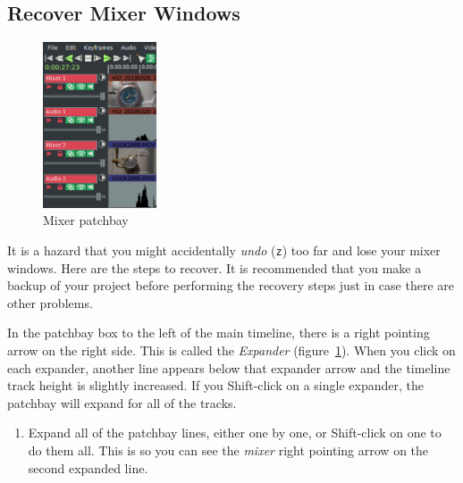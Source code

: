 \subsection{Recover Mixer Windows}%
\label{sub:recover_mixer_windows}

\begin{figure} 
    \vspace{-1ex}
    \centering
    \includegraphics[width=0.3\textwidth]{images/mixer-patchbay01.png}
    \caption{Mixer  patchbay}
    \label{fig:mixer-patchbay01}
\end{figure} 

It is a hazard that you might accidentally \textit{undo} (\texttt{z}) too far and lose your mixer windows.  Here are the steps to recover.  It is recommended that you make a backup of your project before performing the recovery steps just in case there are other problems.

In the patchbay box to the left of the main timeline, there is a right pointing arrow on the right side.  This is called the \textit{Expander} (figure~\ref{fig:mixer-patchbay01}).  When you click on each expander, another line appears below that expander arrow and the timeline track height is slightly increased.  If you Shift-click on a single expander, the patchbay will expand for all of the tracks.

\begin{enumerate}
    \item Expand all of the patchbay lines, either one by one, or Shift-click on one to do them all. This is so you can see the \textit{mixer} right pointing arrow on the second expanded line.    
\end{enumerate}

